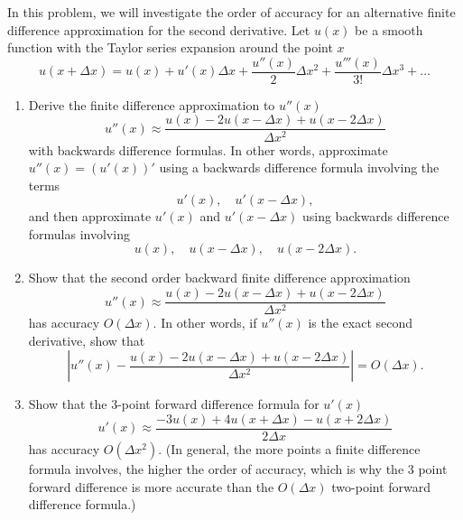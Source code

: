 
In this problem, we will investigate the order of accuracy for an alternative finite difference approximation for the second derivative.  Let $u(x)$ be a smooth function with the Taylor series expansion around the point $x$
\[
u(x+\Delta x) = u(x) + u'(x)\Delta x + \frac{u''(x)}{2}\Delta x^2 + \frac{u'''(x)}{3!}\Delta x^3 + \ldots 
\]
\begin{enumerate}
\item Derive the finite difference approximation to $u''(x)$
\[
u''(x) \approx \frac{u(x)-2u(x-\Delta x) + u(x-2\Delta x)}{\Delta x^2}
\]
with backwards difference formulas.  In other words, approximate $u''(x) = (u'(x))'$ using a backwards difference formula involving the terms
\[
u'(x), \quad u'(x-\Delta x),
\]
and then approximate $u'(x)$ and $u'(x-\Delta x)$ using backwards difference formulas involving 
\[
u(x),\quad u(x-\Delta x), \quad u(x-2\Delta x).
\]
\item Show that the second order backward finite difference approximation
\[
u''(x) \approx \frac{u(x)-2u(x-\Delta x) + u(x-2\Delta x)}{\Delta x^2}
\]
has accuracy $O(\Delta x)$.  In other words, if $u''(x)$ is the exact second derivative, show that 
$$\left| u''(x) - \frac{u(x)-2u(x-\Delta x) + u(x-2\Delta x)}{\Delta x^2}\right| = O(\Delta x).$$

\item Show that the 3-point forward difference formula for $u'(x)$
\[
u'(x) \approx \frac{-3u(x) + 4u(x+\Delta x) - u(x+ 2\Delta x)}{2\Delta x}
\]
has accuracy $O(\Delta x^2)$.  (In general, the more points a finite difference formula involves, the higher the order of accuracy, which is why the 3 point forward difference is more accurate than the $O(\Delta x)$ two-point forward difference formula.)

\end{enumerate}



